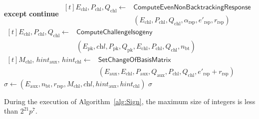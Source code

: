 \begin{algorithm}[!t]
\begin{algorithmic}[1]
     \State \textbf{except}
     \State \quad \textbf{continue}
  \EndIf
     \State $\begin{aligned}[t]
     E_{\mathrm{chl}}, P_{\mathrm{chl}}, Q_{\mathrm{chl}}
     \gets &\textsf{ComputeEvenNonBacktrackingResponse}\\
     &(E_{\mathrm{chl}}, P_{\mathrm{chl}}, Q_{\mathrm{chl}},
     \alpha_{\mathrm{rsp}}, e'_{\mathrm{rsp}}, r_{\mathrm{rsp}})
     \end{aligned}$
  \EndIf
  \State $\begin{aligned}[t]
  E_{\mathrm{chl}}, P_{\mathrm{chl}}, Q_{\mathrm{chl}}
  \gets &\textsf{ComputeChallengeIsogeny}\\
  &(E_{\mathrm{pk}}, \textit{chl},
  P_{\mathrm{pk}}, Q_{\mathrm{pk}}, E_{\mathrm{chl}}, P_{\mathrm{chl}}, Q_{\mathrm{chl}}, n_{\mathrm{bt}})
  \end{aligned}$
  \State $\begin{aligned}[t]
  M_{\mathrm{chl}},\, \mathit{hint}_{\mathrm{aux}},\, \mathit{hint}_{\mathrm{chl}}
  \gets &\textsf{SetChangeOfBasisMatrix}\\
  &(E_{\mathrm{aux}}, E_{\mathrm{chl}},
  P_{\mathrm{aux}}, Q_{\mathrm{aux}}, P_{\mathrm{chl}}, Q_{\mathrm{chl}}, e'_{\mathrm{rsp}}+r_{\mathrm{rsp}})
  \end{aligned}$
  \State $\sigma \gets (E_{\mathrm{aux}}, n_{\mathrm{bt}}, r_{\mathrm{rsp}}, M_{\mathrm{chl}},
                       \textit{chl}, \mathit{hint}_{\mathrm{aux}}, \mathit{hint}_{\mathrm{chl}})$
  \State \Return $\sigma$
\EndWhile
\end{algorithmic}
\end{algorithm}

\begin{theorem}
\label{thm:sign-bound}
During the execution of Algorithm~\ref{alg:Sign}, the maximum size of integers is less than $2^{21}p^7$.
\end{theorem}

